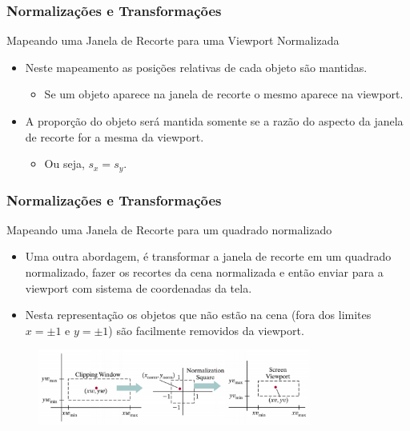 \documentclass{beamer}
\begin{document}
\begin{frame}
\frametitle{Normalizações e Transformações }

	\begin{block}{Mapeando uma Janela de Recorte para uma Viewport Normalizada}
		\begin{itemize}
			\item Neste mapeamento as posições relativas de cada objeto são mantidas.
				\begin{itemize}
					\item Se um objeto aparece na janela de recorte o mesmo aparece na viewport.
				\end{itemize}
			\item A proporção do objeto será mantida somente se a razão do aspecto da janela de recorte for a mesma da viewport.
				\begin{itemize}
					\item Ou seja, $s_x = s_y$.
				\end{itemize}							 
		\end{itemize}	
	\end{block}
\end{frame}

\begin{frame}
\frametitle{Normalizações e Transformações }

	\begin{block}{Mapeando uma Janela de Recorte para um quadrado normalizado}
		\begin{itemize}
			\item Uma outra abordagem, é transformar a janela de recorte em um quadrado normalizado, fazer os recortes da cena normalizada e então enviar para a viewport com sistema de coordenadas da tela.
			\item Nesta representação os objetos que não estão na cena (fora dos limites $x=\pm1$ e $y=\pm1$) são facilmente removidos da viewport.				 
		\end{itemize}	
	\end{block}
	
	\begin{figure}[!h]
			\begin{center}
				\includegraphics[width=0.8\textwidth]{Figures/QuaNor}
			\end{center}
	\end{figure}	
\end{frame}
\end{document}
